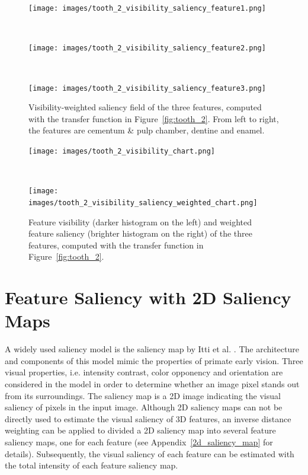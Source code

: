 \begin{figure}
	\centering
	\begin{minipage}{.3\textwidth}
		\texttt{[image: images/tooth\_2\_visibility\_saliency\_feature1.png]}
	\end{minipage}~
	\begin{minipage}{.3\textwidth}
		\texttt{[image: images/tooth\_2\_visibility\_saliency\_feature2.png]}
	\end{minipage}~
	\begin{minipage}{.3\textwidth}
		\texttt{[image: images/tooth\_2\_visibility\_saliency\_feature3.png]}
	\end{minipage}
	\caption{Visibility-weighted saliency field of the three features, computed with the transfer function in Figure~\ref{fig:tooth_2}. From left to right, the features are cementum \& pulp chamber, dentine and enamel.}
	\label{fig:tooth_saliency_field_2}
\end{figure}

\begin{figure}
	\centering
	\begin{minipage}{.45\textwidth}
		\texttt{[image: images/tooth\_2\_visibility\_chart.png]}
	\end{minipage}~
	\begin{minipage}{.45\textwidth}
		\texttt{[image: images/tooth\_2\_visibility\_saliency\_weighted\_chart.png]}
	\end{minipage}
	\caption{Feature visibility (darker histogram on the left) and weighted feature saliency (brighter histogram on the right) of the three features, computed with the transfer function in Figure~\ref{fig:tooth_2}.}
	\label{fig:tooth_saliency_chart_2}
\end{figure}

\section{Feature Saliency with 2D Saliency Maps}
A widely used saliency model is the saliency map by Itti et al. \cite{itti_model_1998}.
The architecture and components of this model mimic the properties of primate early vision.
Three visual properties, i.e. intensity contrast, color opponency and orientation are considered in the model in order to determine whether an image pixel stands out from its surroundings.
The saliency map is a 2D image indicating the visual saliency of pixels in the input image. Although 2D saliency maps can not be directly used to estimate the visual saliency of 3D features, an inverse distance weighting \cite{shepard_two-dimensional_1968} can be applied to divided a 2D saliency map into several feature saliency maps, one for each feature (see Appendix~\ref{2d_saliency_map} for details). Subsequently, the visual saliency of each feature can be estimated with the total intensity of each feature saliency map. 

